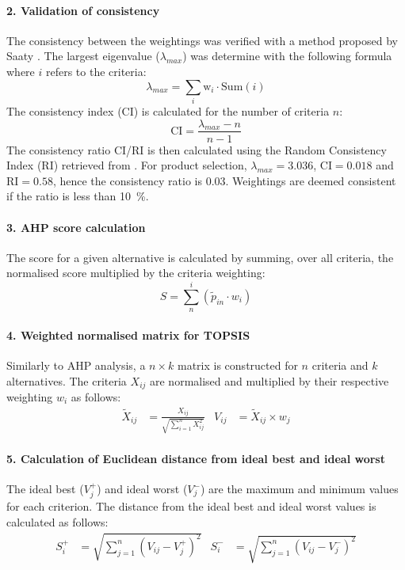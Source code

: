 \paragraph{2. Validation of consistency}
The consistency between the weightings was verified with a method proposed by Saaty \cite{saaty_analytic_1987}. The largest eigenvalue ($\lambda_{max}$) was determine with the following formula where $i$ refers to the criteria:
\begin{equation}
    \lambda_{max}=\sum_{i} \mathrm{w}_{i}\cdot \mathrm{Sum}(i)
\end{equation}
The consistency index (CI) is calculated for the number of criteria $n$:
\begin{equation}
   \mathrm{CI} = \frac{\lambda_{max}-n}{n-1}
\end{equation}
The consistency ratio CI/RI is then calculated using the Random Consistency Index (RI) retrieved from \cite{saaty_analytic_1987}.
For product selection, $\lambda_{max}=3.036$, $\mathrm{CI}=0.018$ and $\mathrm{RI}=0.58$, hence the consistency ratio is 0.03. Weightings are deemed consistent if the ratio is less than \SI{10}{\percent}.

\paragraph{3. AHP score calculation}
The score for a given alternative is calculated by summing, over all criteria, the normalised score multiplied by the criteria weighting:
\begin{equation}
    S=\sum^{i}_{n}(\tilde{p}_{in} \cdot w_{i})
\end{equation}

\paragraph{4. Weighted normalised matrix for TOPSIS}
Similarly to AHP analysis, a $n\times k$ matrix is constructed for $n$ criteria and $k$ alternatives. The criteria $X_{ij}$ are normalised and multiplied by their respective weighting $w_i$ as follows:
\begin{align}
    \tilde{X}_{ij}&=\frac{X_{ij}}{\sqrt{\sum^{n}_{i=1}X_{ij}^{2}}} &
    V_{ij}&=\tilde{X}_{ij}\times w_j
\end{align}

\paragraph{5. Calculation of Euclidean distance from ideal best and ideal worst}
The ideal best ($V_{j}^{+}$) and ideal worst ($V_{j}^{-}$) are the maximum and minimum values for each criterion. The distance from the ideal best and ideal worst values is calculated as follows:
\begin{align}
    S_{i}^{+}&=\sqrt{\sum_{j=1}^{n}(V_{ij}-V_{j}^{+})^2} &
    S_{i}^{-}&=\sqrt{\sum_{j=1}^{n}(V_{ij}-V_{j}^{-})^2}
\end{align}


